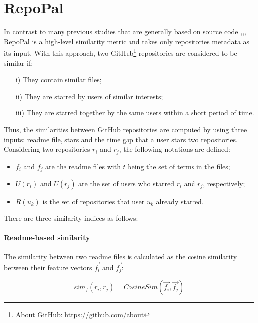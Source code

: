 \section{RepoPal}

In contrast to many previous studies that are generally based on source code \cite{10.1109/APSEC.2004.69},\cite{Liu:2006:GDS:1150402.1150522},\cite{McMillan:2012:DSS:2337223.2337267}, RepoPal  \cite{10.1109/SANER.2017.7884605} is a high-level similarity metric and takes only repositories metadata as its input. With this approach, two GitHub\footnote{About GitHub: \url{https://github.com/about}} repositories are considered to be similar if:

\begin{itemize}
	\item[i)] They contain similar  files;
	\item[ii)] They are starred by users of similar interests;
	\item[iii)] They are starred together by the same users within a short period of time. 
\end{itemize}

Thus, the similarities between GitHub repositories are computed by using three inputs: readme file, stars and the time gap that a user stars two repositories. Considering two repositories $ r_{i} $ and $ r_{j} $, the following notations are defined: 

\begin{itemize}
	\item $ f_{i} $ and $ f_{j} $ are the readme files with $ t $ being the set of terms in the files; 
	\item $ U(r_{i}) $ and $ U(r_{j}) $ are the set of users who starred $ r_{i} $ and $ r_{j} $, respectively; 
	\item $ R(u_{k}) $ is the set of repositories that user $ u_{k} $ already starred.  
\end{itemize}

There are three similarity indices as follows:

\paragraph{Readme-based similarity} 

The similarity between two readme files is calculated as the cosine similarity between their feature vectors $\vec{f_{i}}$ and $\vec{f_{j}}$: 

\begin{equation}
sim_{f}(r_{i},r_{j})=CosineSim(\vec{f_{i}},\vec{f_{j}})
\end{equation}

